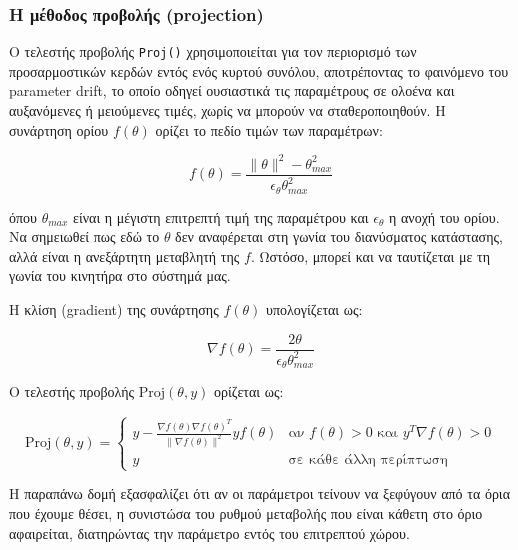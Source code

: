 \documentclass{article}
\begin{document}
    \subsubsection{Η μέθοδος προβολής (projection)}
    Ο τελεστής προβολής \texttt{Proj()} χρησιμοποιείται για τον περιορισμό των προσαρμοστικών κερδών εντός ενός κυρτού συνόλου, αποτρέποντας το φαινόμενο του \foreignlanguage{english}{parameter drift}, το οποίο οδηγεί ουσιαστικά τις παραμέτρους σε ολοένα και αυξανόμενες ή μειούμενες τιμές, χωρίς να μπορούν να σταθεροποιηθούν. Η συνάρτηση ορίου \(f(\theta)\) ορίζει το πεδίο τιμών των παραμέτρων:
    
    \begin{equation*}
        f(\theta) = \frac{\|\theta\|^2 - \theta_{max}^2}{\epsilon_\theta \theta_{max}^2}
    \end{equation*}
    
    \noindent
    όπου \(\theta_{max}\) είναι η μέγιστη επιτρεπτή τιμή της παραμέτρου και \(\epsilon_\theta\) η ανοχή του ορίου. Να σημειωθεί πως εδώ το \(\theta\) δεν αναφέρεται στη γωνία του διανύσματος κατάστασης, αλλά είναι η ανεξάρτητη μεταβλητή της \(f\). Ωστόσο, μπορεί και να ταυτίζεται με τη γωνία του κινητήρα στο σύστημά μας.  
    
    \noindent
    Η κλίση (gradient) της συνάρτησης \(f(\theta)\) υπολογίζεται ως:
    
    \begin{equation*}
        \nabla f(\theta) = \frac{2\theta}{\epsilon_\theta \theta_{max}^2}
    \end{equation*}
    
    \noindent
    Ο τελεστής προβολής \(\text{Proj}(\theta, y)\) ορίζεται ως:
    
    \begin{equation*}
        \text{Proj}(\theta, y) = 
        \begin{cases} 
            y - \frac{\nabla f(\theta) \nabla f(\theta)^T}{\|\nabla f(\theta)\|^2} y f(\theta) & \text{αν } f(\theta) > 0 \text{ και } y^T \nabla f(\theta) > 0 \\
            y & \text{σε κάθε άλλη περίπτωση}
        \end{cases}
    \end{equation*}
    
    \hfill\break
    Η παραπάνω δομή εξασφαλίζει ότι αν οι παράμετροι τείνουν να ξεφύγουν από τα όρια που έχουμε θέσει, η συνιστώσα του ρυθμού μεταβολής που είναι κάθετη στο όριο αφαιρείται, διατηρώντας την παράμετρο εντός του επιτρεπτού χώρου.
    
\end{document}
